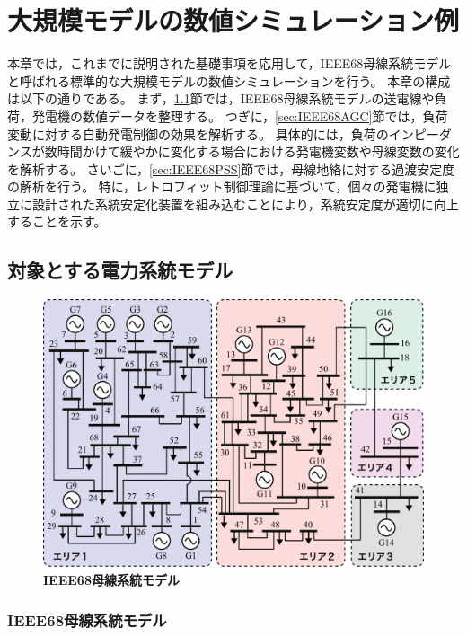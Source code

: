 \documentclass[tombow,dvipdfmx]{corona-a5-1.1}
\begin{document}
\chapter{大規模モデルの数値シミュレーション例}\label{chap:largesim}

本章では，これまでに説明された基礎事項を応用して，IEEE68母線系統モデルと呼ばれる標準的な大規模モデルの数値シミュレーションを行う。
本章の構成は以下の通りである。
まず，\ref{sec:IEEE68}節では，IEEE68母線系統モデルの送電線や負荷，発電機の数値データを整理する。
つぎに，\ref{sec:IEEE68AGC}節では，負荷変動に対する自動発電制御の効果を解析する。
具体的には，負荷のインピーダンスが数時間かけて緩やかに変化する場合における発電機変数や母線変数の変化を解析する。
さいごに，\ref{sec:IEEE68PSS}節では，母線地絡に対する過渡安定度の解析を行う。
特に，レトロフィット制御理論に基づいて，個々の発電機に独立に設計された系統安定化装置を組み込むことにより，系統安定度が適切に向上することを示す。


\section{対象とする電力系統モデル}\label{sec:IEEE68}

\begin{figure}[t]
\centering
\includegraphics[width = .99\linewidth]{figs/IEEE68bus}
\medskip
\caption{\textbf{IEEE68母線系統モデル}}
\label{fig:IEEE68bus}
\medskip
\end{figure}

\subsection{IEEE68母線系統モデル}
\end{document}
